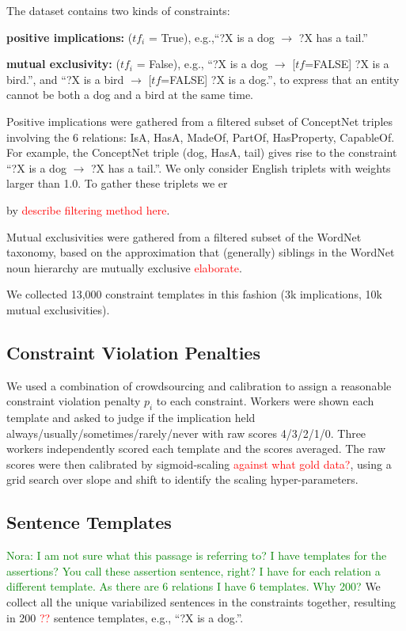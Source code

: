 \documentclass[11pt]{article}
\newcommand{\nk}[1]{\textcolor{green}{Nora: #1}}
\newcommand{\red}[1]{\textcolor{red}{#1}}
\newenvironment{des}{                 %
     \parskip 0cm \begin{list}{}{\parsep 0cm \itemsep 0cm \topsep 0cm}}{
       \end{list}} %
\begin{document}
\noindent
The dataset contains two kinds of constraints:
\begin{des}
\item[{\bf positive implications:}] ($tf_i$ = True), e.g.,``?X is a dog $\rightarrow$ ?X has a tail.''
\item[{\bf mutual exclusivity:}] ($tf_i$ = False), e.g.,
``?X is a dog $\rightarrow$ [$tf$=FALSE] ?X is a bird.'',
and ``?X is a bird $\rightarrow$ [$tf$=FALSE] ?X is a dog.'', to
express that an entity cannot be both a dog and a bird at the same time.

\end{des}
Positive implications were gathered from a filtered subset of ConceptNet triples involving the 6 relations: IsA, HasA, MadeOf, PartOf, HasProperty, CapableOf. For example, the ConceptNet triple (dog, HasA, tail) gives rise to the constraint ``?X is a dog $\rightarrow$ ?X has a tail.''. We only consider English triplets with weights larger than 1.0. To gather these triplets we er 

by \red{describe filtering method here}.

Mutual exclusivities were gathered from a filtered subset of the WordNet taxonomy,
based on the approximation that (generally) siblings in the WordNet noun hierarchy
are mutually exclusive \red{elaborate}.

We collected 13,000 constraint templates in this fashion (3k implications, 10k mutual
exclusivities).

\subsection{Constraint Violation Penalties}

We used a combination of crowdsourcing and calibration to assign a reasonable
constraint violation penalty $p_i$ to each constraint. Workers were shown each
template and asked to judge if the implication held always/usually/sometimes/rarely/never with raw scores 4/3/2/1/0.
Three workers independently scored each template and the scores averaged.
The raw scores were then calibrated by sigmoid-scaling \red{against what gold data?}, using a
grid search over slope and shift to identify the scaling hyper-parameters.

\subsection{Sentence Templates}
\nk{I am not sure what this passage is referring to? I have templates for the assertions? You call these assertion sentence, right? I have for each relation a different template. As there are 6 relations I have 6 templates. Why 200?}
We collect all the unique variabilized sentences in the constraints together,
resulting in 200 \red{??} sentence templates, e.g., ``?X is a dog.''.
\end{document}

